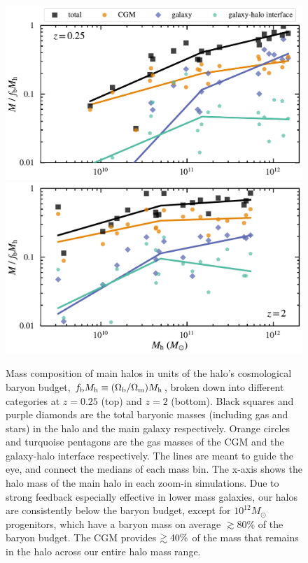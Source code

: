 \documentclass[fleqn,usenatbib]{mnras}
\begin{document}
\begin{figure}
\includegraphics[width=\columnwidth]{figures/mass_budget_snum465.pdf}
\includegraphics[width=\columnwidth]{figures/mass_budget_snum172.pdf}
\caption{
Mass composition of main halos in units of the halo's cosmological baryon budget,  $f_{\rm b} M_{\rm h}\equiv (\Omega_{\rm b}/\Omega_{\rm m} ) M_{\rm h}$, broken down into different categories at $z=0.25$ (top) and $z=2$ (bottom).
Black squares and purple diamonds are the total baryonic masses (including gas and stars) in the halo and the main galaxy respectively.
Orange circles  and turquoise pentagons are the gas masses of the CGM and the galaxy-halo interface respectively. 
The lines are meant to guide the eye, and connect the medians of each mass bin.
The x-axis shows the halo mass of the main halo in each zoom-in simulations.
Due to strong feedback especially effective in lower mass galaxies, our halos are consistently below the baryon budget, except for $10^{12} M_\odot$ progenitors, which have a baryon mass on average $\gtrsim 80\%$ of the baryon budget. 
The CGM provides $\gtrsim 40\%$ of the mass that remains in the halo across our entire halo mass range. 
}
\label{fig:mass_budget}
\end{figure}
\end{document}
